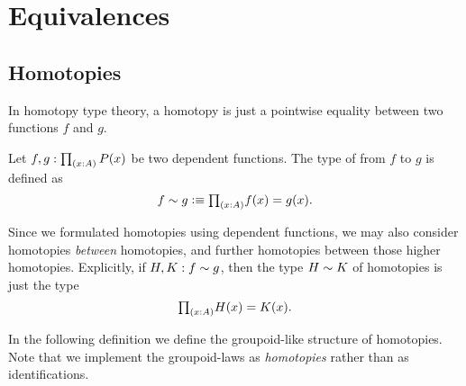 
\chapter{Equivalences}

\section{Homotopies}
In homotopy type theory, a homotopy is just a pointwise equality between two functions $f$ and $g$.

\begin{defn}
Let $f,g:\prd{x:A}P(x)$ be two dependent functions. The type of  from $f$ to $g$ is defined as
\begin{equation*}
f\htpy g \defeq \prd{x:A} f(x)=g(x).
\end{equation*}
\end{defn}

Since we formulated homotopies using dependent functions, we may also consider homotopies \emph{between} homotopies, and further homotopies between those higher homotopies. 
Explicitly, if $H,K:f\sim g$, then the type $H\sim K$ of homotopies is just the type
\begin{equation*}
\prd{x:A} H(x)=K(x).
\end{equation*}

In the following definition we define the groupoid-like structure of homotopies. Note that we implement the groupoid-laws as \emph{homotopies} rather than as identifications.

